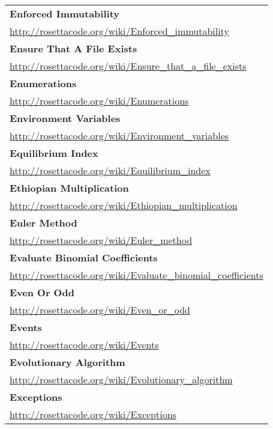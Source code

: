 \begin{longtable}{l}
\textbf{
Enforced Immutability } \\ \href{http://rosettacode.org/wiki/Enforced\_immutability}{http://rosettacode.org/wiki/Enforced\_immutability} \\
\textbf{Ensure That A File Exists } \\ \href{http://rosettacode.org/wiki/Ensure\_that\_a\_file\_exists}{http://rosettacode.org/wiki/Ensure\_that\_a\_file\_exists} \\
\textbf{Enumerations } \\ \href{http://rosettacode.org/wiki/Enumerations}{http://rosettacode.org/wiki/Enumerations} \\
\textbf{
Environment Variables } \\ \href{http://rosettacode.org/wiki/Environment\_variables}{http://rosettacode.org/wiki/Environment\_variables} \\
\textbf{Equilibrium Index } \\ \href{http://rosettacode.org/wiki/Equilibrium\_index}{http://rosettacode.org/wiki/Equilibrium\_index} \\
\textbf{Ethiopian Multiplication } \\ \href{http://rosettacode.org/wiki/Ethiopian\_multiplication}{http://rosettacode.org/wiki/Ethiopian\_multiplication} \\
\textbf{
Euler Method } \\ \href{http://rosettacode.org/wiki/Euler\_method}{http://rosettacode.org/wiki/Euler\_method} \\
\textbf{Evaluate Binomial Coefficients } \\ \href{http://rosettacode.org/wiki/Evaluate\_binomial\_coefficients}{http://rosettacode.org/wiki/Evaluate\_binomial\_coefficients} \\
\textbf{Even Or Odd } \\ \href{http://rosettacode.org/wiki/Even\_or\_odd}{http://rosettacode.org/wiki/Even\_or\_odd} \\
\textbf{Events } \\ \href{http://rosettacode.org/wiki/Events}{http://rosettacode.org/wiki/Events} \\
\textbf{
Evolutionary Algorithm } \\ \href{http://rosettacode.org/wiki/Evolutionary\_algorithm}{http://rosettacode.org/wiki/Evolutionary\_algorithm} \\
\textbf{Exceptions } \\ \href{http://rosettacode.org/wiki/Exceptions}{http://rosettacode.org/wiki/Exceptions} \\

\end{longtable}
